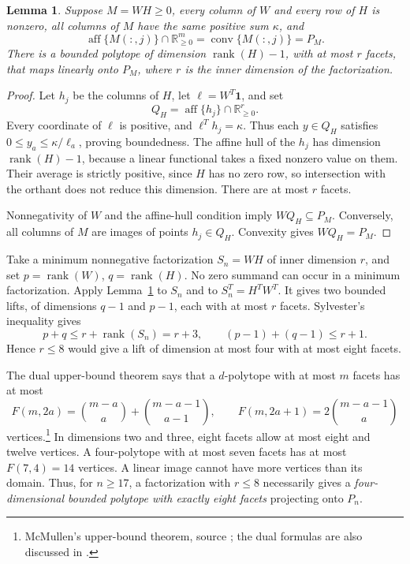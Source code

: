 \documentclass[11pt]{article}
\newtheorem{lemma}[theorem]{Lemma}
\theoremstyle{definition}
\newcommand{\rank}{\operatorname{rank}}
\newcommand{\aff}{\operatorname{aff}}
\newcommand{\conv}{\operatorname{conv}}
\newcommand{\R}{\mathbb R}
\newcommand{\one}{\mathbf 1}
\begin{document}
\begin{lemma}\label{lem:bounded}
Suppose $M=WH\ge0$, every column of $W$ and every row of $H$ is nonzero, all columns of $M$ have the same positive sum $\kappa$, and
\[
 \aff\{M(:,j)\}\cap\R^m_{\ge0}=\conv\{M(:,j)\}=P_M.
\]
There is a bounded polytope of dimension $\rank(H)-1$, with at most $r$ facets, that maps linearly onto $P_M$, where $r$ is the inner dimension of the factorization.
\end{lemma}
\begin{proof}
Let $h_j$ be the columns of $H$, let $\ell=W^T\one$, and set
\[
 Q_H=\aff\{h_j\}\cap\R^r_{\ge0}.
\]
Every coordinate of $\ell$ is positive, and $\ell^Th_j=\kappa$. Thus each $y\in Q_H$ satisfies $0\le y_a\le\kappa/\ell_a$, proving boundedness. The affine hull of the $h_j$ has dimension $\rank(H)-1$, because a linear functional takes a fixed nonzero value on them. Their average is strictly positive, since $H$ has no zero row, so intersection with the orthant does not reduce this dimension. There are at most $r$ facets.

Nonnegativity of $W$ and the affine-hull condition imply $WQ_H\subseteq P_M$. Conversely, all columns of $M$ are images of points $h_j\in Q_H$. Convexity gives $WQ_H=P_M$.
\end{proof}

Take a minimum nonnegative factorization $S_n=WH$ of inner dimension $r$, and set $p=\rank(W)$, $q=\rank(H)$. No zero summand can occur in a minimum factorization. Apply Lemma~\ref{lem:bounded} to $S_n$ and to $S_n^T=H^TW^T$. It gives two bounded lifts, of dimensions $q-1$ and $p-1$, each with at most $r$ facets. Sylvester's inequality gives
\begin{equation}\label{eq:balance}
 p+q\le r+\rank(S_n)=r+3,
 \qquad (p-1)+(q-1)\le r+1.
\end{equation}
Hence $r\le8$ would give a lift of dimension at most four with at most eight facets.

The dual upper-bound theorem says that a $d$-polytope with at most $m$ facets has at most
\begin{equation}\label{eq:F}
 F(m,2a)=\binom{m-a}{a}+\binom{m-a-1}{a-1},\qquad
 F(m,2a+1)=2\binom{m-a-1}{a}
\end{equation}
vertices.\footnote{McMullen's upper-bound theorem, source \cite{mcmullen}; the dual formulas are also discussed in \cite{ggs}.} In dimensions two and three, eight facets allow at most eight and twelve vertices. A four-polytope with at most seven facets has at most $F(7,4)=14$ vertices. A linear image cannot have more vertices than its domain. Thus, for $n\ge17$, a factorization with $r\le8$ necessarily gives a \emph{four-dimensional bounded polytope with exactly eight facets} projecting onto $P_n$.
\end{document}
